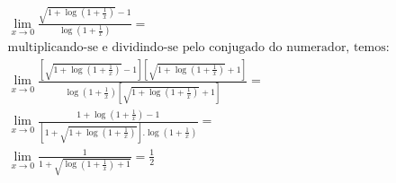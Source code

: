\begin{ex}
\begin{align}
&\lim_{x\rightarrow 0} \frac{\sqrt{1+\log(1+\frac{1}{x})}-1}{\log(1+\frac{1}{x})}=\nonumber\\
&\text{multiplicando-se e dividindo-se pelo conjugado do numerador, temos:}\nonumber\\
&\lim_{x\rightarrow 0} \frac{\left[\sqrt{1+\log(1+\frac{1}{x})}-1\right]\left[\sqrt{1+\log(1+\frac{1}{x})}+1\right]}{\log(1+\frac{1}{x})\left[\sqrt{1+\log(1+\frac{1}{x})}+1\right]}=\nonumber\\
&\lim_{x\rightarrow 0} \frac{1+\log(1+\frac{1}{x})-1}{\left[1+\sqrt{1+\log(1+\frac{1}{x})}\right].\log(1+\frac{1}{x})}=\nonumber\\
&\lim_{x\rightarrow 0} \frac{1}{1+\sqrt{\log(1+\frac{1}{x})+1}}=\frac{1}{2}\nonumber
\end{align}
\end{ex}